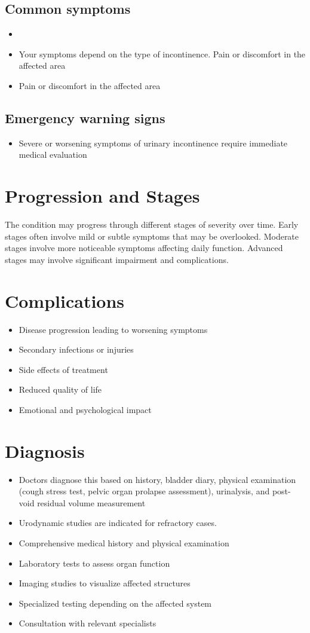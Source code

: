 \subsection{Common symptoms}
\begin{itemize}[noitemsep]
  \item \item Your symptoms depend on the type of incontinence. Pain or discomfort in the affected area    \item Pain or discomfort in the affected area
  \end{itemize}
\subsection{Emergency warning signs}
\begin{itemize}[noitemsep]
  \item Severe or worsening symptoms of urinary incontinence require immediate medical evaluation
\end{itemize}
\section{Progression and Stages}
The condition may progress through different stages of severity over time. Early stages often involve mild or subtle symptoms that may be overlooked. Moderate stages involve more noticeable symptoms affecting daily function. Advanced stages may involve significant impairment and complications.
\section{Complications}
\begin{itemize}[noitemsep]
  \item Disease progression leading to worsening symptoms
  \item Secondary infections or injuries
  \item Side effects of treatment
  \item Reduced quality of life
  \item Emotional and psychological impact
\end{itemize}
\section{Diagnosis}
\begin{itemize}[noitemsep]
  \item Doctors diagnose this based on history, bladder diary, physical examination (cough stress test, pelvic organ prolapse assessment), urinalysis, and post-void residual volume measurement
  \item Urodynamic studies are indicated for refractory cases.
  \item Comprehensive medical history and physical examination
  \item Laboratory tests to assess organ function
  \item Imaging studies to visualize affected structures
  \item Specialized testing depending on the affected system
  \item Consultation with relevant specialists
\end{itemize}
